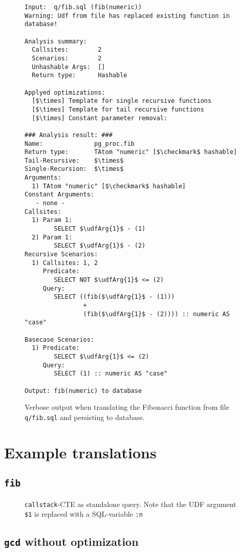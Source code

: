 \begin{figure}[h]
    \centering
    \footnotesize
    \begin{lstlisting}
Input:	q/fib.sql (fib(numeric))
Warning: Udf from file has replaced existing function in database!

Analysis summary:
  Callsites:		2
  Scenarios:		2
  Unhashable Args:	[]
  Return type:		Hashable

Applyed optimizations:
  [$\times] Template for single recursive functions
  [$\times] Template for tail recursive functions
  [$\times] Constant parameter removal: 

### Analysis result: ###
Name:              pg_proc.fib
Return type:       TAtom "numeric" [$\checkmark$ hashable]
Tail-Recursive:    $\times$
Single-Recursion:  $\times$
Arguments:
  1) TAtom "numeric" [$\checkmark$ hashable]
Constant Arguments:
   - none -
Callsites:
  1) Param 1:
        SELECT $\udfArg{1}$ - (1) 
  2) Param 1:
        SELECT $\udfArg{1}$ - (2) 
Recursive Scenarios:
  1) Callsites: 1, 2
     Predicate:
        SELECT NOT $\udfArg{1}$ <= (2) 
     Query:
        SELECT ((fib($\udfArg{1}$ - (1)))
                +
                (fib($\udfArg{1}$ - (2)))) :: numeric AS "case" 

Basecase Scenarios:
  1) Predicate:
        SELECT $\udfArg{1}$ <= (2) 
     Query:
        SELECT (1) :: numeric AS "case" 
        
Output:	fib(numeric) to database
    \end{lstlisting}
    \caption{Verbose output when translating the Fibonacci function from file \texttt{q/fib.sql} and persisting to database.}
\end{figure}

\section{Example translations}
\subsection{\texttt{fib}}
\begin{figure}
    \centering
    \caption{\texttt{callstack}-CTE as standalone query. Note that the UDF argument \texttt{\$1} is replaced with a SQL-variable \texttt{:n}}
    \label{fib:callstack_cte_complete}
\end{figure}
\subsection{\texttt{gcd} without optimization}
